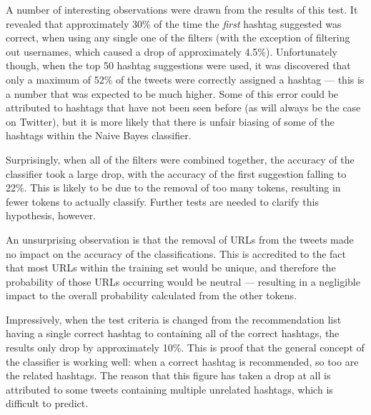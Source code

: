 \documentclass[11pt,a4paper]{report}
\begin{document}
A number of interesting observations were drawn from the results of this test. It revealed that approximately 30\% of the time the \emph{first} hashtag suggested was correct, when using any single one of the filters (with the exception of filtering out usernames, which caused a drop of approximately 4.5\%). Unfortunately though, when the top 50 hashtag suggestions were used, it was discovered that only a maximum of 52\% of the tweets were correctly assigned a hashtag --- this is a number that was expected to be much higher. Some of this error could be attributed to hashtags that have not been seen before (as will always be the case on Twitter), but it is more likely that there is unfair biasing of some of the hashtags within the Naive Bayes classifier.

Surprisingly, when all of the filters were combined together, the accuracy of the classifier took a large drop, with the accuracy of the first suggestion falling to 22\%. This is likely to be due to the removal of too many tokens, resulting in fewer tokens to actually classify. Further tests are needed to clarify this hypothesis, however.

An unsurprising observation is that the removal of URLs from the tweets made no impact on the accuracy of the classifications. This is accredited to the fact that most URLs within the training set would be unique, and therefore the probability of those URLs occurring would be neutral --- resulting in a negligible impact to the overall probability calculated from the other tokens.

Impressively, when the test criteria is changed from the recommendation list having a single correct hashtag to containing all of the correct hashtags, the results only drop by approximately 10\%. This is proof that the general concept of the classifier is working well: when a correct hashtag is recommended, so too are the related hashtags. The reason that this figure has taken a drop at all is attributed to some tweets containing multiple unrelated hashtags, which is difficult to predict.
\end{document}
